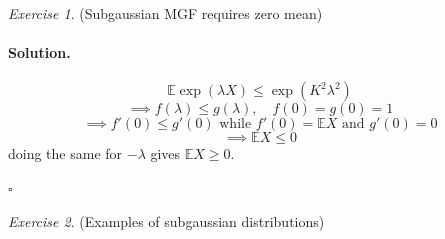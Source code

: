 \documentclass[11pt]{article}
\theoremstyle{definition}
\theoremstyle{remark}
\newtheorem{exercise}{Exercise}[section]
\newenvironment{solution}{\paragraph{Solution.}}{\hfill$\square$\medskip}
\newcommand{\E}{\mathbb{E}}
\newcommand{\1}{\mathbf{1}}
\begin{document}
\begin{exercise}
	(Subgaussian MGF requires zero mean)
\end{exercise}

\begin{solution}
	\[
	\E \exp( \lambda X) \leq \exp(K^2 \lambda^2)
	\]
	\[
	\implies f(\lambda) \leq g(\lambda), \quad f(0) = g(0) = 1
	\]
	\[
	\implies f'(0) \leq g'(0) \text{ while } f'(0) = \E X \text{ and } g'(0) = 0  
	\]
	\[
	\implies \E X \leq 0
	\]
doing the same for \(-\lambda\) gives \(\E X \geq 0\).	

\end{solution}

\begin{exercise}
	(Examples of subgaussian distributions)
\end{exercise}
\end{document}
